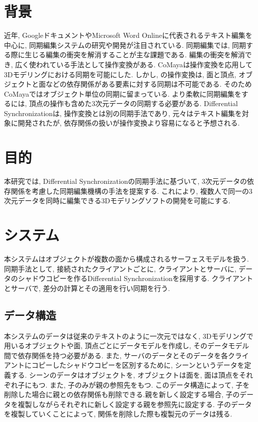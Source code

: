 \documentclass{AIabst}
\begin{document}
\makeAbstHeader
%
%
%
\section{背景}
	近年, GoogleドキュメントやMicrosoft Word Onlineに代表されるテキスト編集を中心に, 同期編集システムの研究や開発が注目されている.
	同期編集では, 同期する際に生じる編集の衝突を解消することが主な課題である.
	編集の衝突を解消でき, 広く使われている手法として操作変換がある.
	CoMaya\cite{COMAYA}は操作変換を応用して3Dモデリングにおける同期を可能にした.
	しかし, \cite{COMAYA}の操作変換は, 面と頂点, オブジェクトと面などの依存関係がある要素に対する同期は不可能である.
	そのためCoMayaではオブジェクト単位の同期に留まっている.
	より柔軟に同期編集をするには, 頂点の操作も含めた3次元データの同期する必要がある.
	Differential Synchronization\cite{DS}は, 操作変換とは別の同期手法であり, 元々はテキスト編集を対象に開発されたが, 依存関係の扱いが操作変換より容易になると予想される.
\section{目的}
 本研究では, Differential Synchronizationの同期手法に基づいて, 3次元データの依存関係を考慮した同期編集機構の手法を提案する.
  これにより, 複数人で同一の3次元データを同時に編集できる3Dモデリングソフトの開発を可能にする.
\section{システム}
 本システムはオブジェクトが複数の面から構成されるサーフェスモデルを扱う. 同期手法として, 接続されたクライアントごとに, クライアントとサーバに, データのシャドウコピーを作るDifferential Synchronizationを採用する. クライアントとサーバで, 差分の計算とその適用を行い同期を行う.
  \subsection{データ構造}
	本システムのデータは従来のテキストのように一次元ではなく, 3Dモデリングで用いるオブジェクトや面, 頂点ごとにデータモデルを作成し, そのデータモデル間で依存関係を持つ必要がある.
  また, サーバのデータとそのデータを各クライアントにコピーしたシャドウコピーを区別するために, シーンというデータを定義する.
  シーンのデータはオブジェクトを, オブジェクトは面を, 面は頂点をそれぞれ子にもつ. また, 子のみが親の参照先をもつ.
  このデータ構造によって, 子を削除した場合に親との依存関係も削除できる.親を新しく設定する場合, 子のデータを複製しながらそれぞれに新しく設定する親を参照先に設定する.
  子のデータを複製していくことによって, 関係を削除した際も複製元のデータは残る.
\end{document}
